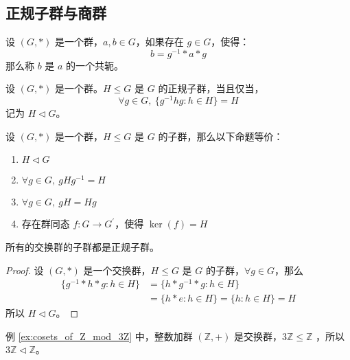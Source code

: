 \vspace{1em}
\subsection{正规子群与商群}
\begin{definition}[共轭 Conjugate]
    设 $(G, *)$ 是一个群，$a, b\in G$，如果存在 $g\in G$，使得：
    \[
        b = g^{-1} * a * g
    \]
    那么称 $b$ 是 $a$ 的一个共轭。
\end{definition}

\begin{definition}
    设 $(G, *)$ 是一个群。$H \le G$ 是 $G$ 的正规子群，当且仅当，
    \[
        \forall g\in G,\ \{g^{-1}h g:h\in H\} = H
    \]
    记为 $H \triangleleft G$。
\end{definition}

\begin{proposition}
    设 $(G, *)$ 是一个群，$H \le G$ 是 $G$ 的子群，那么以下命题等价：
    \begin{enumerate}
        \item $H \triangleleft G$
        \item $\forall g\in G,\ gHg^{-1} = H$
        \item $\forall g\in G,\ gH = Hg$
        \item 存在群同态 $f:G\to G^{\prime}$，使得 $\ker(f) = H$
    \end{enumerate}
\end{proposition}

\begin{proposition}
    所有的交换群的子群都是正规子群。
\end{proposition}
\begin{proof}
    设 $(G, *)$ 是一个交换群，$H \le G$ 是 $G$ 的子群，$\forall g\in G$，那么
    \begin{align*}
        \{g^{-1} * h * g:h\in H\} &= \{h * g^{-1} * g:h\in H\} \\
        &= \{h * e:h\in H\} = \{h:h\in H\} = H
    \end{align*}
    所以 $H \triangleleft G$。
\end{proof}

\begin{note}
    例 \ref{ex:cosets_of_Z_mod_3Z} 中，整数加群 $(\mathbb{Z}, +)$ 是交换群，$3\mathbb{Z} \leq \mathbb{Z}$ ，所以 $3\mathbb{Z} \triangleleft \mathbb{Z}$。
\end{note}
\vspace{1em}

